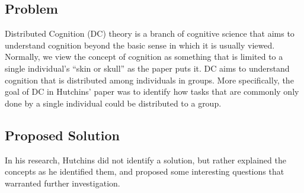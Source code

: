 \subsection{Problem}
Distributed Cognition (DC) theory is a branch of cognitive science that aims to understand cognition beyond the basic sense in which it is usually viewed. Normally, we view the concept of cognition as something that is limited to a single individual's ``skin or skull'' as the paper puts it. DC aims to understand cognition that is distributed among individuals in groups. More specifically, the goal of DC in Hutchins' paper was to identify how tasks that are commonly only done by a single individual could be distributed to a group.

\subsection{Proposed Solution}
In his research, Hutchins did not identify a solution, but rather explained the concepts as he identified them, and proposed some interesting questions that warranted further investigation.
